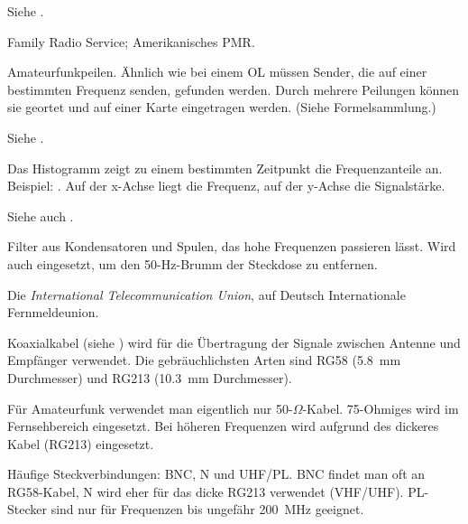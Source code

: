 {Siehe .}

{Family Radio Service; Amerikanisches PMR.}

{Amateurfunkpeilen. Ähnlich wie bei einem OL müssen Sender, die auf einer bestimmten Frequenz senden, gefunden werden. Durch mehrere Peilungen können sie geortet und auf einer Karte eingetragen werden. (Siehe Formelsammlung.)}

{Siehe .}

{Das Histogramm zeigt zu einem bestimmten Zeitpunkt die Frequenzanteile an. Beispiel: . Auf der x-Achse liegt die Frequenz, auf der y-Achse die Signalstärke.

Siehe auch .}

{Filter aus Kondensatoren und Spulen, das hohe Frequenzen passieren lässt. Wird auch eingesetzt, um den 50-Hz-Brumm der Steckdose zu entfernen.}

{Die \textit{International Telecommunication Union}, auf Deutsch Internationale Fernmeldeunion. }

{Koaxialkabel (siehe ) wird für die Übertragung der Signale zwischen Antenne und Empfänger verwendet. Die gebräuchlichsten Arten sind RG58 (5.8 mm Durchmesser) und RG213 (10.3 mm Durchmesser).

Für Amateurfunk verwendet man eigentlich nur 50-$\Omega$-Kabel. 75-Ohmiges wird im Fernsehbereich eingesetzt. Bei höheren Frequenzen wird aufgrund des  dickeres Kabel (RG213) eingesetzt.
}

{Häufige Steckverbindungen: BNC, N und UHF/PL. BNC findet man oft an RG58-Kabel, N wird eher für das dicke RG213 verwendet (VHF/UHF). PL-Stecker sind nur für Frequenzen bis ungefähr 200 MHz geeignet.}

